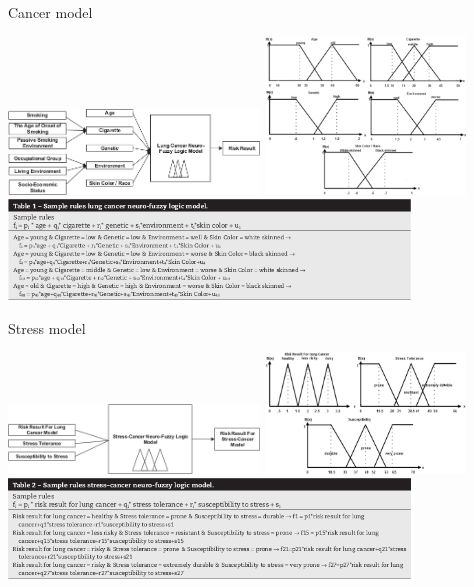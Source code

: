 \begin{frame}{Cancer model}
  \begin{center}
    \includegraphics[width=0.5\textwidth]{img/cancerModel.png}\hspace{0.5cm}
    \includegraphics[width=0.4\textwidth]{img/cancerMember.png}\\[0.5cm]
    \includegraphics[width=0.8\textwidth]{img/cancerRules.png}
  \end{center}
\end{frame}

\begin{frame}{Stress model}
  \begin{center}
    \includegraphics[width=0.5\textwidth]{img/stressModel.png}\hspace{0.5cm}
    \includegraphics[width=0.4\textwidth]{img/stressMember.png}\\[0.5cm]
    \includegraphics[width=0.8\textwidth]{img/stressRules.png}
  \end{center}
\end{frame}

